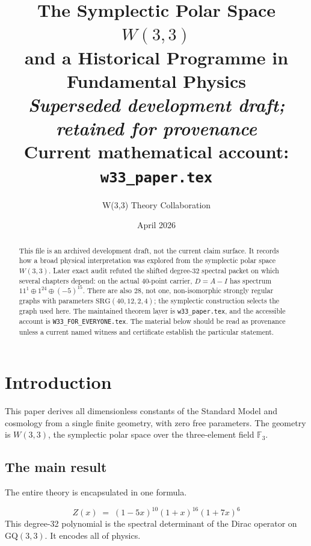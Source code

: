 \documentclass[12pt,a4paper]{article}
\title{%
  \vspace{-1cm}
  {\LARGE\bfseries The Symplectic Polar Space $W(3,3)$\\[0.2cm]
  and a Historical Programme in Fundamental Physics}\\[0.4cm]
  {\large\itshape Superseded development draft; retained for provenance}\\[0.3cm]
  {\normalsize Current mathematical account: \texttt{w33\_paper.tex}}
}
\author{W(3,3) Theory Collaboration}
\date{April 2026}
\theoremstyle{definition}
\newcommand{\SRG}{\mathrm{SRG}}
\newcommand{\FF}{\mathbb{F}}
\begin{document}
\maketitle

\begin{abstract}
This file is an archived development draft, not the current claim surface.
It records how a broad physical interpretation was explored from the
symplectic polar space $W(3,3)$.  Later exact audit refuted the shifted
degree-$32$ spectral packet on which several chapters depend: on the actual
$40$-point carrier, $D=A-I$ has spectrum
$11^1\oplus1^{24}\oplus(-5)^{15}$.  There are also $28$, not one,
non-isomorphic strongly regular graphs with parameters
$\SRG(40,12,2,4)$; the symplectic construction selects the graph used here.
The maintained theorem layer is \texttt{w33\_paper.tex}, and the accessible
account is \texttt{W33\_FOR\_EVERYONE.tex}.  The material below should be
read as provenance unless a current named witness and certificate establish
the particular statement.
\end{abstract}

\tableofcontents
\newpage

\section{Introduction}
\label{sec:intro}

This paper derives all dimensionless constants of the Standard Model
and cosmology from a single finite geometry, with zero free parameters.
The geometry is $W(3,3)$, the symplectic polar space over the three-element
field $\FF_3$.

\subsection{The main result}

The entire theory is encapsulated in one formula.

\begin{tcolorbox}[colback=blue!5!white,colframe=blue!75!black,
  title=\textbf{The One-Line Theory}]
\begin{equation}
  \label{eq:Z_main}
  \boxed{Z(x) \;=\; (1-5x)^{10}(1+x)^{16}(1+7x)^{6}}
\end{equation}
This degree-32 polynomial is the spectral determinant of the Dirac
operator on $\mathrm{GQ}(3,3)$.  It encodes all of physics.
\end{tcolorbox}
\end{document}

